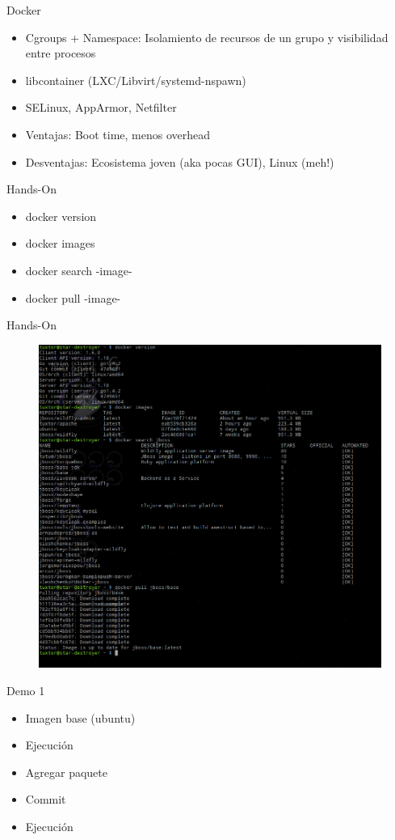 \documentclass{beamer}
\begin{document}
\begin{frame}{Docker}
\begin{itemize}
\item Cgroups + Namespace: Isolamiento de recursos de un grupo y visibilidad entre procesos
\item libcontainer (LXC/Libvirt/systemd-nspawn)
\item SELinux, AppArmor, Netfilter
\pause\item Ventajas: Boot time, menos overhead
\pause\item Desventajas: Ecosistema joven (aka pocas GUI), Linux \pause (meh!)
\end{itemize}
\end{frame}

\begin{frame}{Hands-On}
\begin{itemize}
\item docker version
\item docker images
\item docker search -image-
\item docker pull -image-
\end{itemize}
\end{frame}

\begin{frame}{Hands-On}
\begin{figure}
\centering
\includegraphics[width=0.8\linewidth]{Images/handson.png}
\label{fig:handson}
\end{figure}
\end{frame}


\begin{frame}{Demo 1}
\begin{itemize}
\item Imagen base (ubuntu)
\item Ejecución
\item Agregar paquete
\item Commit
\item Ejecución
\end{itemize}
\end{frame}
\end{document}
